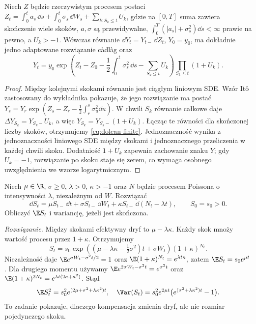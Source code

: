 \begin{twierdzenie}
\label{th:dolean-finite}
Niech $Z$ będzie rzeczywistym procesem postaci
$Z_t=\int_0^t a_s\,\dd s+\int_0^t\sigma_s\,\dd W_s
+\sum_{k:S_k\le t}U_k$, gdzie na $[0,T]$ suma zawiera
skończenie wiele skoków, $a,\sigma$ są przewidywalne,
$\int_0^T(|a_s|+\sigma_s^2)\dd s<\infty$ prawie na pewno, a
$U_k>-1$. Wówczas równanie
$\dd Y_t=Y_{t-}\,\dd Z_t$, $Y_0=y_0$, ma dokładnie jedno
adaptowane rozwiązanie càdlàg oraz
\[
Y_t=y_0\exp\left(Z_t-Z_0-\frac12\int_0^t\sigma_s^2\,\dd s
-\sum_{S_k\le t}U_k\right)
\prod_{S_k\le t}(1+U_k).
\tag{12.5}\label{eq:dolean-finite}
\]
\end{twierdzenie}
\begin{proof}
Między kolejnymi skokami równanie jest ciągłym liniowym
SDE. Wzór Itô zastosowany do wykładnika pokazuje,
że jego rozwiązanie ma postać
$Y_s=Y_r\exp(Z_s-Z_r-\frac12\int_r^s\sigma_u^2\dd u)$.
W chwili $S_k$ równanie całkowe daje
$\Delta Y_{S_k}=Y_{S_k-}U_k$, a więc
$Y_{S_k}=Y_{S_k-}(1+U_k)$.
Łącząc te równości dla skończonej liczby skoków,
otrzymujemy \eqref{eq:dolean-finite}. Jednoznaczność
wynika z jednoznaczności liniowego SDE między skokami
i jednoznacznego przeliczenia w każdej chwili skoku.
Dodatniość $1+U_k$ zapewnia zachowanie znaku $Y$;
gdy $U_k=-1$, rozwiązanie po skoku staje się zerem,
co wymaga osobnego uwzględnienia we wzorze logarytmicznym.
\end{proof}

\begin{zadanie}
Niech $\mu\in\R$, $\sigma\ge0$, $\lambda>0$, $\kappa>-1$
oraz $N$ będzie procesem Poissona o intensywności $\lambda$,
niezależnym od $W$. Rozwiązać
\[
\dd S_t=\mu S_{t-}\,\dd t+\sigma S_{t-}\,\dd W_t
+\kappa S_{t-}\,\dd(N_t-\lambda t),\qquad S_0=s_0>0.
\]
Obliczyć $\E S_t$ i wariancję, jeżeli jest skończona.

\emph{Rozwiązanie.} Między skokami efektywny dryf to
$\mu-\lambda\kappa$. Każdy skok mnoży wartość procesu
przez $1+\kappa$. Otrzymujemy
\[
S_t=s_0\exp\left((\mu-\lambda\kappa-\tfrac12\sigma^2)t
+\sigma W_t\right)(1+\kappa)^{N_t}.
\]
Niezależność daje
$\E e^{\sigma W_t-\sigma^2t/2}=1$ oraz
$\E(1+\kappa)^{N_t}=e^{\lambda t\kappa}$,
zatem $\E S_t=s_0e^{\mu t}$.
Dla drugiego momentu używamy
$\E e^{2\sigma W_t-\sigma^2t}=e^{\sigma^2t}$ oraz
$\E(1+\kappa)^{2N_t}=e^{\lambda t(2\kappa+\kappa^2)}$.
Stąd
\[
\E S_t^2=s_0^2e^{(2\mu+\sigma^2+\lambda\kappa^2)t},
\quad
\Var(S_t)=s_0^2e^{2\mu t}
\bigl(e^{(\sigma^2+\lambda\kappa^2)t}-1\bigr).
\]
To zadanie pokazuje, dlaczego kompensacja zmienia dryf,
ale nie rozmiar pojedynczego skoku.
\end{zadanie}


